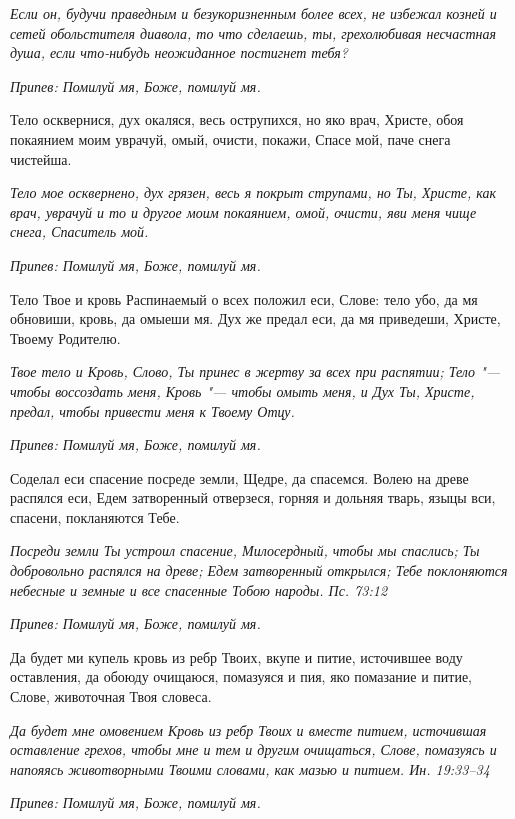 \itshape Если он, будучи праведным и безукоризненным более всех, не избежал козней и сетей обольстителя диавола, то что сделаешь, ты, грехолюбивая несчастная душа, если что-нибудь неожиданное постигнет тебя?\normalfont{}


\itshape Припев:\normalfont{} Помилуй мя, Боже, помилуй мя.


Тело осквернися, дух окаляся, весь острупихся, но яко врач, Христе, обоя покаянием моим уврачуй, омый, очисти, покажи, Спасе мой, паче снега чистейша.


\itshape Тело мое осквернено, дух грязен, весь я покрыт струпами, но Ты, Христе, как врач, уврачуй и то и другое моим покаянием, омой, очисти, яви меня чище снега, Спаситель мой.\normalfont{}


\itshape Припев:\normalfont{} Помилуй мя, Боже, помилуй мя.


Тело Твое и кровь Распинаемый о всех положил еси, Слове: тело убо, да мя обновиши, кровь, да омыеши мя. Дух же предал еси, да мя приведеши, Христе, Твоему Родителю.


\itshape Твое тело и Кровь, Слово, Ты принес в жертву за всех при распятии; Тело "--- чтобы воссоздать меня, Кровь "--- чтобы омыть меня, и Дух Ты, Христе, предал, чтобы привести меня к Твоему Отцу.\normalfont{}


\itshape Припев:\normalfont{} Помилуй мя, Боже, помилуй мя.


Соделал еси спасение посреде земли, Щедре, да спасемся. Волею на древе распялся еси, Едем затворенный отверзеся, горняя и дольняя тварь, языцы вси, спасени, покланяются Тебе.


\itshape Посреди земли Ты устроил спасение, Милосердный, чтобы мы спаслись; Ты добровольно распялся на древе; Едем затворенный открылся; Тебе поклоняются небесные и земные и все спасенные Тобою народы. Пс. 73:12\normalfont{}


\itshape Припев:\normalfont{} Помилуй мя, Боже, помилуй мя.


Да будет ми купель кровь из ребр Твоих, вкупе и питие, источившее воду оставления, да обоюду очищаюся, помазуяся и пия, яко помазание и питие, Слове, животочная Твоя словеса.


\itshape Да будет мне омовением Кровь из ребр Твоих и вместе питием, источившая оставление грехов, чтобы мне и тем и другим очищаться, Слове, помазуясь и напояясь животворными Твоими словами, как мазью и питием. Ин. 19:33–34\normalfont{}


\itshape Припев:\normalfont{} Помилуй мя, Боже, помилуй мя.


